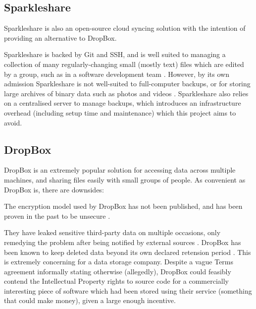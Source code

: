 \documentclass[12pt,a4paper,]{adreport}
\begin{document}
\subsection{Sparkleshare}\label{sparkleshare}

Sparkleshare \cite{sparkleshare} is also an open-source cloud syncing
solution with the intention of providing an alternative to DropBox.

Sparkleshare is backed by Git and SSH, and is well suited to managing a
collection of many regularly-changing small (mostly text) files which
are edited by a group, such as in a software development team \cite{SSGood}. However, by its own admission Sparkleshare is
not well-suited to full-computer backups, or for storing large archives
of binary data such as photos and videos \cite{SSBad}. Sparkleshare also relies on a centralised server to manage backups, which introduces an infrastructure overhead (including setup time and maintenance) which this project aims to avoid.

\subsection{DropBox}\label{dropbox}

DropBox is an extremely popular solution for accessing data across
multiple machines, and sharing files easily with small groups of people.
As convenient as DropBox is, there are downsides:

The encryption model used by DropBox has not been published, and has
been proven in the past to be unsecure \cite{polishStuff}.

They have leaked sensitive third-party data on multiple occasions, only
remedying the problem after being notified by external
sources \cite{MM, DN, other}. DropBox has been known to keep deleted data beyond its own declared retension period \cite{keepTooLong}. This is extremely concerning for a data storage company.
Despite a vague Terms agreement informally stating otherwise
(allegedly), DropBox could feasibly contend the Intellectual Property
rights to source code for a commercially interesting piece of software
which had been stored using their service (something that could make
money), given a large enough incentive.
\end{document}
